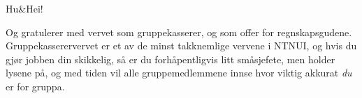 Hu\&Hei!

Og gratulerer med vervet som gruppekasserer, og som offer for regnskapsgudene. \\
Gruppekasserervervet er et av de minst takknemlige vervene i NTNUI, og hvis du gjør jobben din skikkelig, så er du forhåpentligvis litt småsjefete, men holder lysene på, og med tiden vil alle gruppemedlemmene innse hvor viktig akkurat \emph{du} er for gruppa.